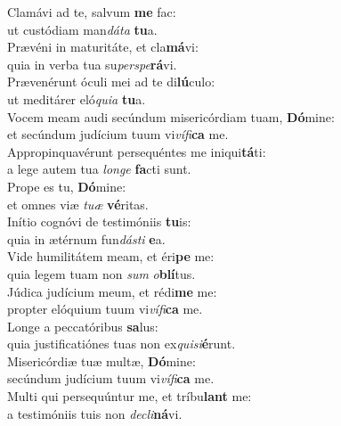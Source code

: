\evenverse Clamávi ad te, salvum \textbf{me} fac:~\*\\
\evenverse ut custódiam man\textit{dá}\textit{ta} \textbf{tu}a.\\
\oddverse Prævéni in maturitáte, et cla\textbf{má}vi:~\*\\
\oddverse quia in verba tua su\textit{per}\textit{spe}\textbf{rá}vi.\\
\evenverse Prævenérunt óculi mei ad te di\textbf{lú}culo:~\*\\
\evenverse ut meditárer eló\textit{qui}\textit{a} \textbf{tu}a.\\
\oddverse Vocem meam audi secúndum misericórdiam tuam, \textbf{Dó}mine:~\*\\
\oddverse et secúndum judícium tuum vi\textit{ví}\textit{fi}\textbf{ca} me.\\
\evenverse Appropinquavérunt persequéntes me iniqui\textbf{tá}ti:~\*\\
\evenverse a lege autem tua \textit{lon}\textit{ge} \textbf{fa}cti sunt.\\
\oddverse Prope es tu, \textbf{Dó}mine:~\*\\
\oddverse et omnes viæ \textit{tu}\textit{æ} \textbf{vé}ritas.\\
\evenverse Inítio cognóvi de testimóniis \textbf{tu}is:~\*\\
\evenverse quia in ætérnum fun\textit{dá}\textit{sti} \textbf{e}a.\\
\oddverse Vide humilitátem meam, et éri\textbf{pe} me:~\*\\
\oddverse quia legem tuam non \textit{sum} \textit{o}\textbf{blí}tus.\\
\evenverse Júdica judícium meum, et rédi\textbf{me} me:~\*\\
\evenverse propter elóquium tuum vi\textit{ví}\textit{fi}\textbf{ca} me.\\
\oddverse Longe a peccatóribus \textbf{sa}lus:~\*\\
\oddverse quia justificatiónes tuas non ex\textit{qui}\textit{si}\textbf{é}runt.\\
\evenverse Misericórdiæ tuæ multæ, \textbf{Dó}mine:~\*\\
\evenverse secúndum judícium tuum vi\textit{ví}\textit{fi}\textbf{ca} me.\\
\oddverse Multi qui persequúntur me, et tríbu\textbf{lant} me:~\*\\
\oddverse a testimóniis tuis non \textit{de}\textit{cli}\textbf{ná}vi.\\
